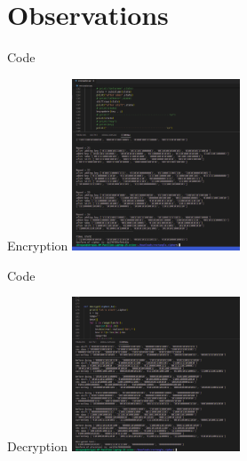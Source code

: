 \section{Observations}

\begin{frame}{Code}
\begin{block} {Encryption}
    \centering
\includegraphics[width=50mm]{img_11.png}
\centering
\end{block}
\end{frame}


\begin{frame}{Code}
\begin{block} {Decryption}
    \centering
\includegraphics[width=50mm]{img_12.png}
\centering
\end{block}
\end{frame}

